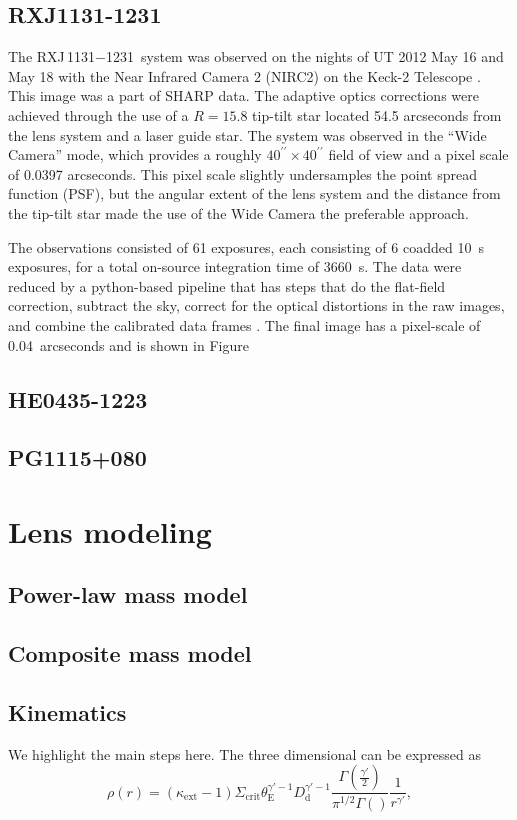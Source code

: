 \documentclass[fleqn,usenatbib]{mnras}
\newcommand\rxj{RXJ\,1131$-$1231}
\begin{document}
\subsection{RXJ1131-1231}
The \rxj\ system was observed on the nights of UT 2012 May 16 and May 18 with the Near Infrared Camera 2 (NIRC2) on the Keck-2 Telescope \citep[e.g.,][]{wizinowich03}. This image was a part of SHARP data. The adaptive optics corrections were achieved through the use of a $R = 15.8$ tip-tilt star located 54.5 arcseconds from the lens system and a laser guide star.  The system was observed in the ``Wide Camera'' mode, which provides a roughly $40^{\prime\prime} \times 40^{\prime\prime}$ field of view and a pixel scale of 0.0397 arcseconds. This pixel scale slightly undersamples the point spread function (PSF), but the angular extent of the lens system and the distance from the tip-tilt star made the use of the Wide Camera the preferable approach.

The observations consisted of 61 exposures, each consisting of 6 coadded 10~s exposures, for a total on-source integration time of 3660~s.  The data were reduced by a python-based pipeline that has steps that do the flat-field correction, subtract the sky, correct for the optical distortions in the raw images, and combine the calibrated data frames \citep[for details, see][]{auger_eels}.  The final image has a pixel-scale of 0.04~arcseconds and is shown in Figure %
\subsection{HE0435-1223}
\subsection{PG1115+080}
\section{Lens modeling}
\subsection{Power-law mass model}
\subsection{Composite mass model}
\subsection{Kinematics}
We highlight the main steps here. The three dimensional can be expressed as 
\begin{equation}
\rho\left(r\right)=\left(\kappa_{\textrm{ext}}-1\right)\Sigma_{\textrm{crit}}\theta_{\textrm{E}}^{\gamma\prime-1}D_{\textrm{d}}^{\gamma\prime-1}\frac{\Gamma\left(\frac{\gamma\prime}{2}\right)}{\pi^{1/2}\Gamma\left(\right)}\frac{1}{r^{\gamma\prime}},
\end{equation}
\end{document}
